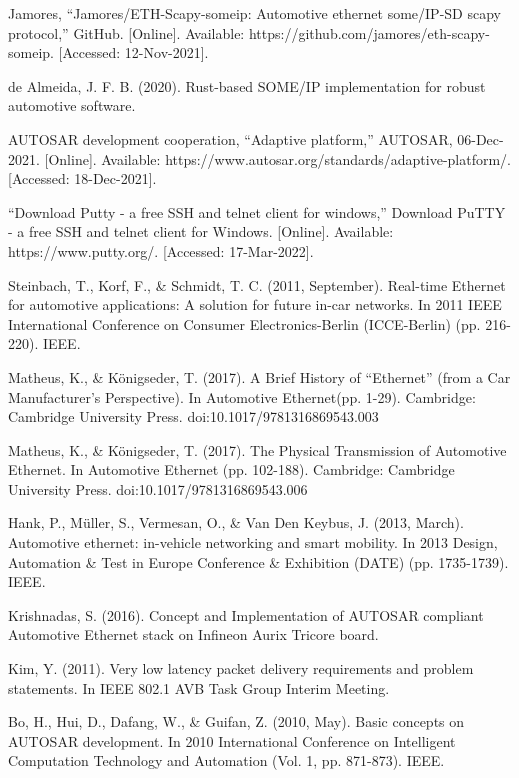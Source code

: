 \documentclass[a4paper, 12pt, oneside, BCOR1cm,toc=chapterentrywithdots]{scrbook}
\begin{document}
\begin{thebibliography}{00}
Jamores, “Jamores/ETH-Scapy-someip: Automotive ethernet some/IP-SD scapy protocol,” GitHub. [Online]. Available: https://github.com/jamores/eth-scapy-someip. [Accessed: 12-Nov-2021]. 

de Almeida, J. F. B. (2020). Rust-based SOME/IP implementation for robust automotive software.

AUTOSAR development cooperation, “Adaptive platform,” AUTOSAR, 06-Dec-2021. [Online]. Available: https://www.autosar.org/standards/adaptive-platform/. [Accessed: 18-Dec-2021]. 

“Download Putty - a free SSH and telnet client for windows,” Download PuTTY - a free SSH and telnet client for Windows. [Online]. Available: https://www.putty.org/. [Accessed: 17-Mar-2022]. 

 Steinbach, T., Korf, F., \& Schmidt, T. C. (2011, September). Real-time Ethernet for automotive applications: A solution for future in-car networks. In 2011 IEEE International Conference on Consumer Electronics-Berlin (ICCE-Berlin) (pp. 216-220). IEEE.

 Matheus, K., \& Königseder, T. (2017). A Brief History of “Ethernet” (from a Car Manufacturer's Perspective). In Automotive Ethernet(pp. 1-29). Cambridge: Cambridge University Press. doi:10.1017/9781316869543.003 


Matheus, K., \& Königseder, T. (2017). The Physical Transmission of Automotive Ethernet. In Automotive Ethernet (pp. 102-188). Cambridge: Cambridge University Press. doi:10.1017/9781316869543.006

 Hank, P., Müller, S., Vermesan, O., \& Van Den Keybus, J. (2013, March). Automotive ethernet: in-vehicle networking and smart mobility. In 2013 Design, Automation \& Test in Europe Conference \& Exhibition (DATE) (pp. 1735-1739). IEEE.

 Krishnadas, S. (2016). Concept and Implementation of AUTOSAR compliant Automotive Ethernet stack on Infineon Aurix Tricore board.

Kim, Y. (2011). Very low latency packet delivery requirements and problem statements. In IEEE 802.1 AVB Task Group Interim Meeting.

Bo, H., Hui, D., Dafang, W., \& Guifan, Z. (2010, May). Basic concepts on AUTOSAR development. In 2010 International Conference on Intelligent Computation Technology and Automation (Vol. 1, pp. 871-873). IEEE.


\end{thebibliography}
\end{document}
